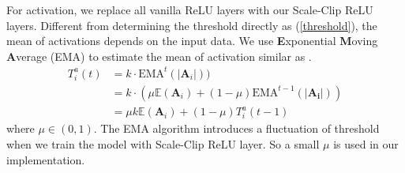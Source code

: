 \documentclass[letterpaper]{article} %
\begin{document}




For activation, we replace all vanilla ReLU layers with our Scale-Clip ReLU layers.
Different from determining the threshold directly as (\ref{threshold}), the mean of activations depends on the input data. We use \textbf{E}xponential \textbf{M}oving \textbf{A}verage (EMA) to estimate the mean of activation similar as \cite{jacob2017quantization}. 
\begin{equation}
\begin{aligned}
	T^{a}_{i}(t) & = k \cdot \text{EMA}^{t}(|\mathbf{A}_{i}|)) \\
    & = k \cdot (\mu \mathbb{E}(\mathbf{A}_{i}) + (1-\mu)\text{EMA}^{t-1}(|\mathbf{A_i}|)) \\
    & = \mu k\mathbb{E}(\mathbf{A}_{i}) + (1-\mu)T^{a}_{i}(t-1)
\end{aligned}
\end{equation}
where $\mu \in (0, 1)$. The EMA algorithm introduces a fluctuation of threshold when we train the model with Scale-Clip ReLU layer. So a small $\mu$ is used in our implementation. 
\end{document}
